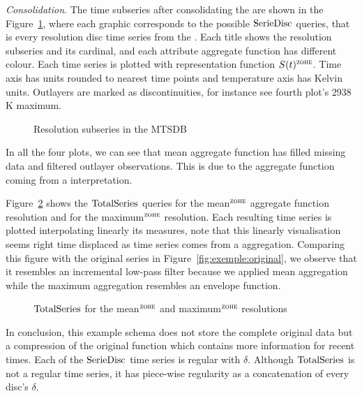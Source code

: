 \emph{Consolidation}. The time subseries after consolidating the
 are shown in the Figure~\ref{fig:exemple:4mrd}, where
each graphic corresponds to the possible $\operatorname{SerieDisc}$ queries, that is
every resolution disc time series from the . Each title
shows the resolution subseries and its cardinal, and each attribute
aggregate function has different colour.  Each time series is plotted
with \zohe{} representation function $S(t)^\zohe{}$. Time axis has
 units rounded to nearest time points and temperature axis
has Kelvin units. Outlayers are marked as discontinuities, for
instance see fourth plot's 2938 K maximum.

\begin{figure}[tp]
  \centering
  
  \caption{Resolution subseries in the MTSDB}
  \label{fig:exemple:4mrd}
\end{figure}

In all the four plots, we can see that mean aggregate function has
filled missing data and filtered outlayer observations. This is due
to the aggregate function coming from a \zohe{} interpretation.

Figure~\ref{fig:exemple:4mrdtot} shows the $\operatorname{TotalSeries}$
queries for the mean$^{\zohe}$ aggregate function resolution and for
the maximum$^{\zohe}$ resolution.  Each resulting time series is
plotted interpolating linearly its measures, note that this linearly
visualisation seems right time displaced as time series comes from a
\zohe{} aggregation.  Comparing this figure with the original series
in Figure~\ref{fig:exemple:original}, we observe that it resembles an
incremental low-pass filter because we applied mean aggregation while
the maximum aggregation resembles an envelope function.

\begin{figure}[tp]
  \centering
  
  \caption{$\operatorname{TotalSeries}$ for the mean$^{\zohe}$ and maximum$^{\zohe}$
    resolutions}
  \label{fig:exemple:4mrdtot}
\end{figure}


In conclusion, this  example schema does not store the
complete original data but a compression of the original function
which contains more information for recent times.  Each of the
$\operatorname{SerieDisc}$ time series is regular with $\delta$. Although
$\operatorname{TotalSeries}$ is not a regular time series, it has piece-wise
regularity as a concatenation of every disc's $\delta$.







